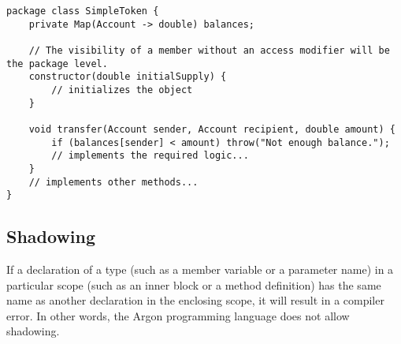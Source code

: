 \begin{lstlisting}[frame=TB, float, title=A simple Argon application,label={lst:code1}]
package class SimpleToken {
    private Map(Account -> double) balances;

    // The visibility of a member without an access modifier will be the package level.
    constructor(double initialSupply) {
        // initializes the object
    }

    void transfer(Account sender, Account recipient, double amount) {
        if (balances[sender] < amount) throw("Not enough balance.");
        // implements the required logic...
    }
    // implements other methods...
}
\end{lstlisting}

\subsection{Shadowing}\label{subsec:shadowing}

If a declaration of a type (such as a member variable or a parameter name) in a particular scope (such as an
inner block or a method definition) has the same name as another declaration in the enclosing scope, it will
result in a compiler error. In other words, the Argon programming language does not allow shadowing.

